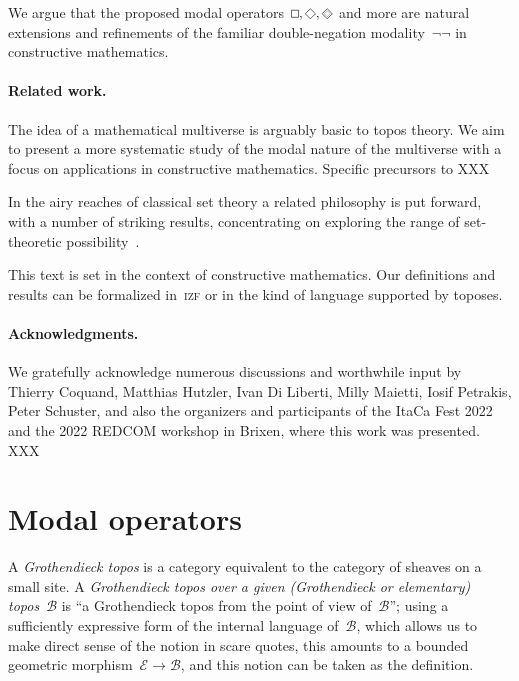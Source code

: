 \documentclass[envcountsect,envcountsame,runningheads]{llncs}
\newcommand{\xxx}[1]{}
\newcommand{\E}{\mathcal{E}}
\newcommand{\B}{\mathcal{B}}
\renewcommand{\_}{\mathpunct{.}\,}
\DeclareMathOperator{\possible}{\text{\tikz[scale=.6ex/1cm,baseline=-.6ex,rotate=45,line width=.1ex]{\draw (-1,-1) rectangle (1,1);}}}
\DeclareMathOperator{\necessary}{\text{\tikz[scale=.6ex/1cm,baseline=-.6ex,line width=.1ex]{\draw (-1,-1) rectangle (1,1);}}}
\DeclareMathOperator{\xpossible}{\text{\tikz[scale=.6ex/1cm,baseline=-.6ex,rotate=45,line width=.1ex]{\draw (-1,-1) rectangle (1,1); \draw[very thin] (-.6,-.6) rectangle (.6,.6);}}}
\newcommand{\?}{\,{:}\,}
\begin{document}
We argue that the proposed modal operators~$\necessary,\possible,\xpossible$ and more are natural extensions and refinements of the
familiar double-negation modality~$\neg\neg$ in constructive mathematics.

\paragraph{Related work.}
The idea of a mathematical multiverse is arguably basic to topos theory. We aim to present a more systematic study of the modal nature of the multiverse with a focus on applications in constructive mathematics. Specific precursors to XXX

In the airy reaches of classical set theory a related philosophy is put forward, with a number of striking results, concentrating on exploring the range of set-theoretic possibility~\cite{hamkins:multiverse,gitman-hamkins:multiverse,hamkins:constructibility,maddy-meadows:reconstruction,barton:forcing}.

\xxx{related work: Hamkins, Victoria Gitman, ... concentrates on exploring
range of set-theoretic possibility, obtaining beautiful results such as ...
Shawn Henry, Andreas Blass ...}

This text is set in the context of constructive mathematics.
Our definitions and results can be formalized in~\textsc{izf} or in the kind of language supported by toposes.

\paragraph{Acknowledgments.} We gratefully acknowledge numerous discussions and worthwhile input by Thierry Coquand, Matthias Hutzler, Ivan Di Liberti, Milly Maietti, Iosif Petrakis, Peter Schuster, and also the organizers and participants of the ItaCa Fest 2022 and the 2022 REDCOM workshop in Brixen, where this work was presented. XXX



\section{Modal operators}
\label{sect:defn-modalities}

\begin{definition}A \emph{Grothendieck topos} is a category equivalent to
the category of sheaves on a small site. A \emph{Grothendieck topos over a
given (Grothendieck or elementary) topos}~$\B$ is ``a Grothendieck topos from
the point of view of~$\B$''; using a sufficiently expressive form of the
internal language of~$\B$, which allows us to make direct sense of the notion in
scare quotes, this amounts to a bounded geometric morphism~$\E \to
\B$, and this notion can be taken as the definition.
\end{definition}
\end{document}
